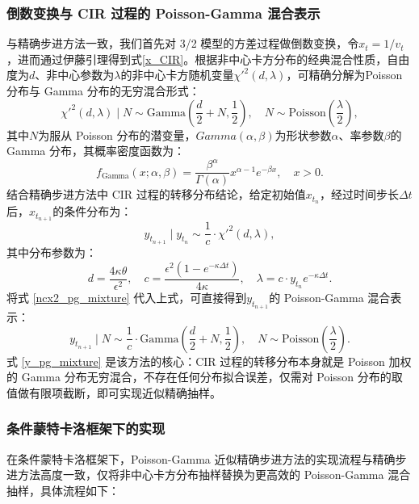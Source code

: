 \subsubsection{倒数变换与 CIR 过程的 Poisson-Gamma 混合表示}
与精确步进方法一致，我们首先对 3/2 模型的方差过程做倒数变换，令$x_t = 1/v_t$，进而通过伊藤引理得到式\eqref{x_CIR}。根据非中心卡方分布的经典混合性质，自由度为$d$、非中心参数为$\lambda$的非中心卡方随机变量$\chi'^2 (d,\lambda)$，可精确分解为Poisson 分布与 Gamma 分布的无穷混合形式：
\begin {equation}\chi'^2 (d, \lambda) \mid N \sim \text {Gamma}\left ( \frac {d}{2} + N, \frac {1}{2} \right), \quad N \sim \text {Poisson}\left ( \frac {\lambda}{2} \right),\label {ncx2_pg_mixture}\end {equation}
其中$N$为服从 Poisson 分布的潜变量，$Gamma(\alpha,\beta)$为形状参数$\alpha$、率参数$\beta$的 Gamma 分布，其概率密度函数为：
\begin {equation}
  f_{\text {Gamma}}(x; \alpha, \beta) = \frac {\beta^\alpha}{\Gamma (\alpha)} x^{\alpha-1} e^{-\beta x}, \quad x > 0.
\end {equation}
结合精确步进方法中 CIR 过程的转移分布结论，给定初始值$x_{t_n}$，经过时间步长$\Delta t$后，$x_{t_{n+1}}$的条件分布为：
\begin {equation}
  y_{t_{n+1}} \mid y_{t_n} \sim \frac {1}{c} \cdot \chi'^2\left ( d, \lambda \right),
\end {equation}
其中分布参数为：
\begin {equation}
  d = \frac {4 \kappa \theta}{\epsilon^2}, \quad c = \frac {\epsilon^2 \left ( 1 - e^{-\kappa \Delta t} \right)}{4 \kappa}, \quad \lambda = c \cdot y_{t_n} e^{-\kappa \Delta t}.
\end {equation}
将式 \eqref{ncx2_pg_mixture} 代入上式，可直接得到$y_{t_{n+1}}$​​的 Poisson-Gamma 混合表示：
\begin {equation}
  y_{t_{n+1}} \mid N \sim \frac {1}{c} \cdot \text {Gamma}\left ( \frac {d}{2} + N, \frac {1}{2} \right), \quad N \sim \text {Poisson}\left ( \frac {\lambda}{2} \right).
\label {y_pg_mixture}
\end {equation}
式 \eqref{y_pg_mixture} 是该方法的核心：CIR 过程的转移分布本身就是 Poisson 加权的 Gamma 分布无穷混合，不存在任何分布拟合误差，仅需对 Poisson 分布的取值做有限项截断，即可实现近似精确抽样。

\subsubsection{条件蒙特卡洛框架下的实现}
在条件蒙特卡洛框架下，Poisson-Gamma 近似精确步进方法的实现流程与精确步进方法高度一致，仅将非中心卡方分布抽样替换为更高效的 Poisson-Gamma 混合抽样，具体流程如下：

